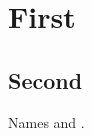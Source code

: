 \documentclass{article}
\begin{document}
\section{First}\label{sec:a}
\subsection{Second}\label{sec:b}
Names  and .
\end{document}
